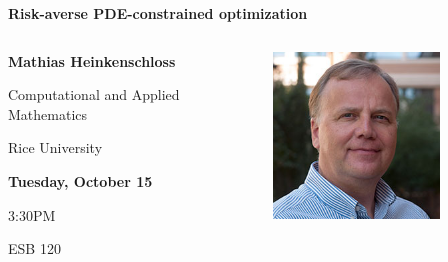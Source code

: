 \documentclass[compress,aspectratio=169]{beamer}
\date{}
\begin{document}
\begin{frame}[fragile]
\centering
\textbf{\huge
Risk-averse PDE-constrained optimization}
\vspace{1em}
\begin{columns}
\begin{column}{0.55\textwidth}
\centering
\textbf{
}

\textbf{
\large
Mathias Heinkenschloss
}

Computational and Applied Mathematics

Rice University

\vspace{2em}
\textbf{
Tuesday, October 15
}

3:30PM

ESB 120

\end{column}
\begin{column}{0.45\textwidth}
\centering
\includegraphics[width=0.7\textwidth]{heinkenschloss.jpg}

\end{column}
\end{columns}


\end{frame}
\end{document}
